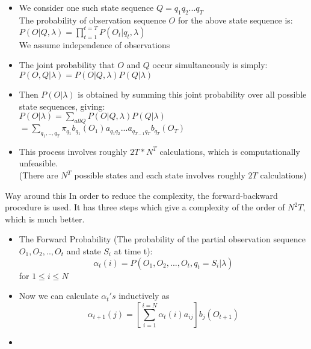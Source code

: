 \documentclass[compress]{beamer}
\begin{document}
\begin{frame}
    \begin{itemize}
    \item We consider one such state sequence $Q=q_1 q_2 ... q_T$\\
    The probability of observation sequence $O$ for the above state sequence is: \\
    $P(O|Q,\lambda)=\prod_{t = 1}^{t = T}P({O_t}|{q_t},\lambda)$
    \\We assume independence of observations
    \pause \item The joint probability that $O$ and $Q$ occur simultaneously is simply:\\
    $P(O,Q|\lambda)=P(O|Q,\lambda)P(Q|\lambda)$
    \pause \item Then $P(O|\lambda)$ is obtained by summing this joint probability over all possible state sequences, giving:\\
    $P(O|\lambda)=\sum_{all Q} P(O|Q,\lambda)P(Q|\lambda)$\\
    $=\sum_{q_1,..,q_T} \pi_{q_1} b_{q_1}(O_1) a_{q_{1}q_{2}}...a_{q_{T-1}q_{T}}b_{q_T}(O_T)$
    \pause \item This process involves roughly $2T*N^T$ calculations, which is computationally unfeasible.\\
    (There are $N^T$ possible states and each state involves roughly $2T$ calculations)
    \end{itemize}
\end{frame}

\begin{frame}{Way around this}
In order to reduce the complexity, the forward-backward procedure is used. It has three steps which give a complexity of the order of $N^2T$, which is much better.

\begin{itemize}

\vfill \pause \item {The Forward Probability (The probability of the partial observation sequence $O_1,O_2,..,O_t$ and state $S_i$ at time t):
\begin{equation*}
 \alpha_t(i) = P(O_1, O_2, ..., O_t,q_t=S_i|\lambda) 
\end{equation*}
}
for $ 1 \leq i \leq N$ \\
\vfill \pause \item  {Now we can calculate $\alpha_t's$ inductively as
\begin{equation*}
 \alpha_{t+1}(j) = [\sum_{i = 1}^{i = N}\alpha_t(i)a_{ij}]b_{j}(O_{t+1})
\end{equation*}
}
\vfill \item {}
\end{itemize}
\end{frame}
\end{document}
